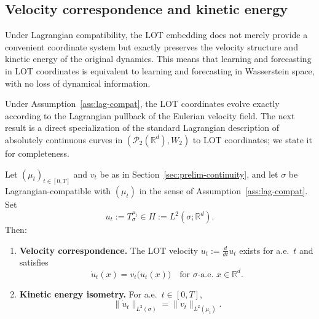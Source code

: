 \documentclass[11pt]{article}
\newcommand{\R}{\mathbb{R}}
\newcommand{\1}{\mathbf{1}}
\begin{document}
\subsection{Velocity correspondence and kinetic energy}\label{sec:velocity-correspondence}

Under Lagrangian compatibility, the LOT embedding does not merely provide a convenient coordinate system but exactly preserves the velocity structure and kinetic energy of the original dynamics. This means that learning and forecasting in LOT coordinates is equivalent to learning and forecasting in Wasserstein space, with no loss of dynamical information.

Under Assumption~\ref{ass:lag-compat}, the LOT coordinates evolve exactly according to the Lagrangian pullback of the Eulerian velocity field. The next result is a direct specialization of the standard Lagrangian description of absolutely continuous curves in $(\mathcal{P}_2(\R^d),W_2)$ to LOT coordinates; we state it for completeness.

\begin{proposition}\label{thm:lot-faithful}
Let $(\mu_t)_{t\in[0,T]}$ and $v_t$ be as in Section~\ref{sec:prelim-continuity}, and let $\sigma$ be Lagrangian-compatible with $(\mu_t)$ in the sense of Assumption~\ref{ass:lag-compat}. Set
\[
u_t := T_\sigma^{\mu_t} \in H := L^2(\sigma;\R^d).
\]
Then:

\begin{enumerate}[label=(\alph*)]
\item \textbf{Velocity correspondence.} The LOT velocity $\dot u_t := \frac{d}{dt}u_t$ exists for a.e.\ $t$ and satisfies
\begin{equation}\label{eq:velocity-correspondence}
\dot u_t(x) = v_t\bigl(u_t(x)\bigr)
\quad \text{for } \sigma\text{-a.e. } x\in\R^d.
\end{equation}

\item \textbf{Kinetic energy isometry.} For a.e.\ $t\in[0,T]$,
\begin{equation}\label{eq:kinetic-isometry}
\|\dot u_t\|_{L^2(\sigma)} = \|v_t\|_{L^2(\mu_t)}.
\end{equation}
\end{enumerate}
\end{proposition}
\end{document}

